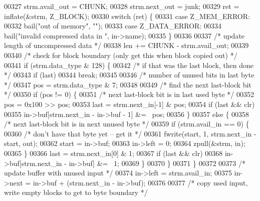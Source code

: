\begin{DoxyCode}
{00327         strm.avail\_out = CHUNK;
00328         strm.next\_out = junk;
00329         ret = inflate(&strm, Z\_BLOCK);
00330         \textcolor{keywordflow}{switch} (ret) \{
00331         \textcolor{keywordflow}{case} Z\_MEM\_ERROR:
00332             bail(\textcolor{stringliteral}{"out of memory"}, \textcolor{stringliteral}{""});
00333         \textcolor{keywordflow}{case} Z\_DATA\_ERROR:
00334             bail(\textcolor{stringliteral}{"invalid compressed data in "}, in->name);
00335         \}
00336 
00337         \textcolor{comment}{/* update length of uncompressed data */}
00338         len += CHUNK - strm.avail\_out;
00339 
00340         \textcolor{comment}{/* check for block boundary (only get this when block copied out) */}
00341         \textcolor{keywordflow}{if} (strm.data\_type & 128) \{
00342             \textcolor{comment}{/* if that was the last block, then done */}
00343             \textcolor{keywordflow}{if} (last)
00344                 \textcolor{keywordflow}{break};
00345 
00346             \textcolor{comment}{/* number of unused bits in last byte */}
00347             pos = strm.data\_type & 7;
00348 
00349             \textcolor{comment}{/* find the next last-block bit */}
00350             \textcolor{keywordflow}{if} (pos != 0) \{
00351                 \textcolor{comment}{/* next last-block bit is in last used byte */}
00352                 pos = 0x100 >> pos;
00353                 last = strm.next\_in[-1] & pos;
00354                 \textcolor{keywordflow}{if} (last && clr)
00355                     in->buf[strm.next\_in - in->buf - 1] &= ~pos;
00356             \}
00357             \textcolor{keywordflow}{else} \{
00358                 \textcolor{comment}{/* next last-block bit is in next unused byte */}
00359                 \textcolor{keywordflow}{if} (strm.avail\_in == 0) \{
00360                     \textcolor{comment}{/* don't have that byte yet -- get it */}
00361                     fwrite(start, 1, strm.next\_in - start, out);
00362                     start = in->buf;
00363                     in->left = 0;
00364                     zpull(&strm, in);
00365                 \}
00366                 last = strm.next\_in[0] & 1;
00367                 \textcolor{keywordflow}{if} (last && clr)
00368                     in->buf[strm.next\_in - in->buf] &= ~1;
00369             \}
00370         \}
00371     \}
00372 
00373     \textcolor{comment}{/* update buffer with unused input */}
00374     in->left = strm.avail\_in;
00375     in->next = in->buf + (strm.next\_in - in->buf);
00376 
00377     \textcolor{comment}{/* copy used input, write empty blocks to get to byte boundary */}
}
\end{DoxyCode}
